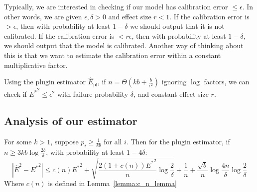 Typically, we are interested in checking if our model has calibration error $\leq \epsilon$. In other words, we are given $\epsilon, \delta > 0$ and effect size $r < 1$. If the calibration error is $> \epsilon$, then with probability at least $1 - \delta$ we should output that it is not calibrated. If the calibration error is $< r\epsilon$, then with probability at least $1 - \delta$, we should output that the model is calibrated. Another way of thinking about this is that we want to estimate the calibration error within a constant multiplicative factor.

\begin{theorem}
\label{thm:final-plugin}
Using the plugin estimator $\hat{E}_{\mbox{pl}}$, if $n = \Theta(kb + \frac{b}{\epsilon^2})$ ignoring $\log$ factors, we can check if ${E^*}^2 \leq \epsilon^2$ with failure probability $\delta$, and constant effect size $r$. 
\end{theorem}


\subsection{Analysis of our estimator}

\begin{theorem}
\label{thm:our-bound}
For some $k > 1$, suppose $p_i \geq \frac{1}{kb}$ for all $i$. Then for the plugin estimator, if $n \geq 3kb \log{\frac{2b}{\delta}}$, with probability at least $1 - 4\delta$:
\[ | \hat{E}^2 - {E^*}^2 | \leq c(n){E^*}^2 + \sqrt{\frac{2(1+c(n)){E^*}^2}{n} \log{\frac{2}{\delta}}} + \frac{1}{n} + \frac{\sqrt{b}}{n}\log{\frac{4n}{\delta}} \log{\frac{2}{\delta}}\]
Where $c(n)$ is defined in Lemma~\ref{lemma:c_n_lemma}
\end{theorem}

